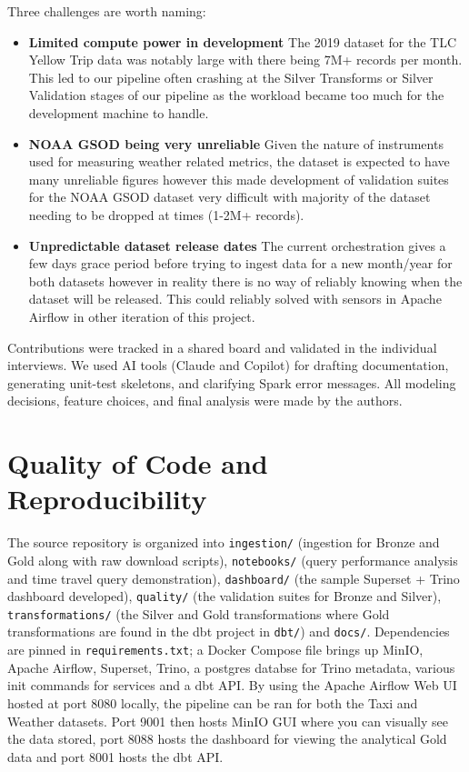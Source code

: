 \documentclass[conference]{IEEEtran}
\begin{document}
Three challenges are worth naming:
\begin{itemize}
    \item \textbf{Limited compute power in development} The 2019 dataset for the TLC Yellow Trip data was notably large with there being 7M+ records per month. This led to our pipeline often crashing at the Silver Transforms or Silver Validation stages of our pipeline as the workload became too much for the development machine to handle.
    \item \textbf{NOAA GSOD being very unreliable} Given the nature of instruments used for measuring weather related metrics, the dataset is expected to have many unreliable figures however this made development of validation suites for the NOAA GSOD dataset very difficult with majority of the dataset needing to be dropped at times (1-2M+ records).
    \item \textbf{Unpredictable dataset release dates} The current orchestration gives a few days grace period before trying to ingest data for a new month/year for both datasets however in reality there is no way of reliably knowing when the dataset will be released. This could reliably solved with sensors in Apache Airflow in other iteration of this project.
\end{itemize}

Contributions were tracked in a shared board and validated in the individual interviews. We used AI tools (Claude and Copilot) for drafting documentation, generating unit-test skeletons, and clarifying Spark error messages. All modeling decisions, feature choices, and final analysis were made by the authors.

\section{Quality of Code and Reproducibility}
\label{sec:code}

The source repository is organized into \texttt{ingestion/} (ingestion for Bronze and Gold along with raw download scripts), \texttt{notebooks/} (query performance analysis and time travel query demonstration), \texttt{dashboard/} (the sample Superset + Trino dashboard developed), \texttt{quality/} (the validation suites for Bronze and Silver), \texttt{transformations/} (the Silver and Gold transformations where Gold transformations are found in the dbt project in \texttt{dbt/}) and \texttt{docs/}. Dependencies are pinned in \texttt{requirements.txt}; a Docker Compose file brings up MinIO, Apache Airflow, Superset, Trino, a postgres databse for Trino metadata, various init commands for services and a dbt API. By using the Apache Airflow Web UI hosted at port 8080 locally, the pipeline can be ran for both the Taxi and Weather datasets. Port 9001 then hosts MinIO GUI where you can visually see the data stored, port 8088 hosts the dashboard for viewing the analytical Gold data and port 8001 hosts the dbt API.
\end{document}
